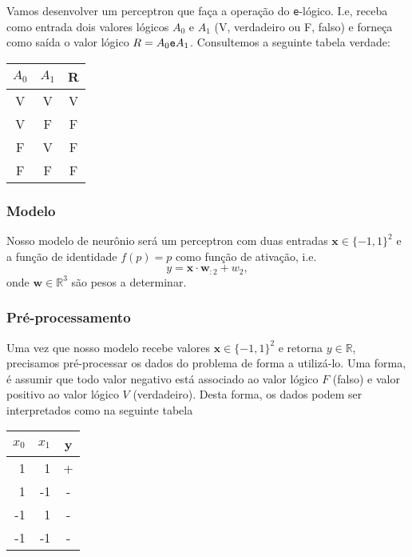 Vamos desenvolver um perceptron que faça a operação do \verb+e+-lógico. I.e, receba como entrada dois valores lógicos $A_0$ e $A_1$ (V, verdadeiro ou F, falso) e forneça como saída o valor lógico $R = A_0 \verb+e+ A_1$. Consultemos a seguinte tabela verdade:

\begin{center}
  \begin{tabular}{cc|c}
    $A_0$ & $A_1$ & R\\\hline
    V & V & V\\
    V & F & F\\
    F & V & F\\
    F & F & F\\\hline
  \end{tabular}
\end{center}

\subsubsection{Modelo}

Nosso modelo de neurônio será um perceptron com duas entradas $\pmb{x}\in \{-1,1\}^2$ e a função de identidade $f(p)=p$ como função de ativação, i.e.
\begin{equation}
  y = \pmb{x}\cdot\pmb{w}_{:2} + w_2,
\end{equation}
onde $\pmb{w}\in\mathbb{R}^3$ são pesos a determinar.
    
\subsubsection{Pré-processamento}

Uma vez que nosso modelo recebe valores $\pmb{x}\in \{-1,1\}^2$ e retorna $y\in\mathbb{R}$, precisamos pré-processar os dados do problema de forma a utilizá-lo. Uma forma, é assumir que todo valor negativo está associado ao valor lógico $F$ (falso) e valor positivo ao valor lógico $V$ (verdadeiro). Desta forma, os dados podem ser interpretados como na seguinte tabela

\begin{center}
  \begin{tabular}{rr|c}
    $x_0$ & $x_1$ & y\\\hline
    1 & 1 & +\\
    1 & -1 & -\\
    -1 & 1 & -\\
    -1 & -1 & -\\\hline
  \end{tabular}
\end{center}
    
